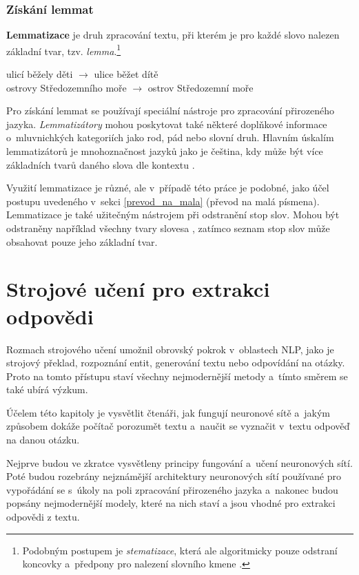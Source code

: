 \subsection{Získání lemmat}
\textbf{Lemmatizace} je druh zpracování textu, při kterém je pro každé slovo nalezen základní tvar, tzv. \emph{lemma}.\footnote{Podobným postupem je \emph{stematizace}, která ale algoritmicky pouze odstraní koncovky a~předpony pro nalezení slovního kmene \cite{information_retrieval}.}
\begin{center}
    ulicí běžely děti $\longrightarrow$ ulice běžet dítě\\
    ostrovy Středozemního moře $\longrightarrow$ ostrov Středozemní moře
\end{center}
Pro získání lemmat se používají speciální nástroje pro zpracování přirozeného jazyka. \emph{Lemma\-tizátory} mohou poskytovat také některé doplňkové informace o~mluvnichkých kategoriích jako rod, pád nebo slovní druh. Hlavním úskalím lemmatizátorů je mnohoznačnost jazyků jako je čeština, kdy může být více základních tvarů daného slova dle kontextu \cite{information_retrieval}.\par
Využití lemmatizace je různé, ale v~případě této práce je podobné, jako účel postupu uvedeného v~sekci \ref{prevod_na_mala} (převod na malá písmena). Lemmatizace je také užitečným nástrojem při odstranění stop slov. Mohou být odstraněny například všechny tvary slovesa , zatímco seznam stop slov může obsahovat pouze jeho základní tvar.



\chapter{Strojové učení pro extrakci odpovědi}
\label{language_comprehension}

Rozmach strojového učení umožnil obrovský pokrok v~oblastech NLP, jako je strojový překlad, rozpoznání entit, generování textu nebo odpovídání na otázky. Proto na tomto přístupu staví všechny nejmodernější metody a~tímto směrem se také ubírá výzkum.\par
Účelem této kapitoly je vysvětlit čtenáři, jak fungují neuronové sítě a~jakým způsobem dokáže počítač porozumět textu a~naučit se vyznačit v~textu odpověď na danou otázku.\par
Nejprve budou ve zkratce vysvětleny principy fungování a~učení neuronových sítí. Poté budou rozebrány nejznámější architektury neuronových sítí používané pro vypořádání se s~úkoly na poli zpracování přirozeného jazyka a~nakonec budou popsány nejmodernější modely, které na nich staví a jsou vhodné pro extrakci odpovědi z textu.
\bigskip

